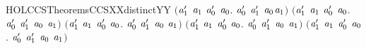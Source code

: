 \begin{SaveVerbatim}{HOLCCSTheoremsCCSXXdistinctYY}
   \ensuremath{(}\HOLSymConst{\HOLTokenForall{}}\ensuremath{\HOLBoundVar{a}\sb{\mathrm{1}}\sp{\prime{}}} \ensuremath{\HOLBoundVar{a}\sb{\mathrm{1}}} \ensuremath{\HOLBoundVar{a}\sb{\mathrm{0}}\sp{\prime{}}} \ensuremath{\HOLBoundVar{a}\sb{\mathrm{0}}}.  \ensuremath{\HOLBoundVar{a}\sb{\mathrm{0}}\sp{\prime{}}} \ensuremath{\HOLBoundVar{a}\sb{\mathrm{1}}\sp{\prime{}}} \HOLSymConst{\HOLTokenNotEqual{}} \ensuremath{\HOLBoundVar{a}\sb{\mathrm{0}}}\HOLSymConst{\ensuremath{\ldotp}}\ensuremath{\HOLBoundVar{a}\sb{\mathrm{1}}}\ensuremath{)} \HOLSymConst{\HOLTokenConj{}}
   \ensuremath{(}\HOLSymConst{\HOLTokenForall{}}\ensuremath{\HOLBoundVar{a}\sb{\mathrm{1}}\sp{\prime{}}} \ensuremath{\HOLBoundVar{a}\sb{\mathrm{1}}} \ensuremath{\HOLBoundVar{a}\sb{\mathrm{0}}\sp{\prime{}}} \ensuremath{\HOLBoundVar{a}\sb{\mathrm{0}}}. \ensuremath{\HOLBoundVar{a}\sb{\mathrm{0}}\sp{\prime{}}} \HOLSymConst{\ensuremath{\mid}} \ensuremath{\HOLBoundVar{a}\sb{\mathrm{1}}\sp{\prime{}}} \HOLSymConst{\HOLTokenNotEqual{}} \ensuremath{\HOLBoundVar{a}\sb{\mathrm{0}}} \HOLSymConst{\ensuremath{+}} \ensuremath{\HOLBoundVar{a}\sb{\mathrm{1}}}\ensuremath{)} \HOLSymConst{\HOLTokenConj{}}
   \ensuremath{(}\HOLSymConst{\HOLTokenForall{}}\ensuremath{\HOLBoundVar{a}\sb{\mathrm{1}}\sp{\prime{}}} \ensuremath{\HOLBoundVar{a}\sb{\mathrm{1}}} \ensuremath{\HOLBoundVar{a}\sb{\mathrm{0}}\sp{\prime{}}} \ensuremath{\HOLBoundVar{a}\sb{\mathrm{0}}}.  \ensuremath{\HOLBoundVar{a}\sb{\mathrm{0}}\sp{\prime{}}} \ensuremath{\HOLBoundVar{a}\sb{\mathrm{1}}\sp{\prime{}}} \HOLSymConst{\HOLTokenNotEqual{}} \ensuremath{\HOLBoundVar{a}\sb{\mathrm{0}}} \HOLSymConst{\ensuremath{+}} \ensuremath{\HOLBoundVar{a}\sb{\mathrm{1}}}\ensuremath{)} \HOLSymConst{\HOLTokenConj{}}
   \ensuremath{(}\HOLSymConst{\HOLTokenForall{}}\ensuremath{\HOLBoundVar{a}\sb{\mathrm{1}}\sp{\prime{}}} \ensuremath{\HOLBoundVar{a}\sb{\mathrm{1}}} \ensuremath{\HOLBoundVar{a}\sb{\mathrm{0}}\sp{\prime{}}} \ensuremath{\HOLBoundVar{a}\sb{\mathrm{0}}}.  \ensuremath{\HOLBoundVar{a}\sb{\mathrm{0}}\sp{\prime{}}} \ensuremath{\HOLBoundVar{a}\sb{\mathrm{1}}\sp{\prime{}}} \HOLSymConst{\HOLTokenNotEqual{}} \ensuremath{\HOLBoundVar{a}\sb{\mathrm{0}}} \HOLSymConst{\ensuremath{+}} \ensuremath{\HOLBoundVar{a}\sb{\mathrm{1}}}\ensuremath{)} \HOLSymConst{\HOLTokenConj{}}
   \ensuremath{(}\HOLSymConst{\HOLTokenForall{}}\ensuremath{\HOLBoundVar{a}\sb{\mathrm{1}}\sp{\prime{}}} \ensuremath{\HOLBoundVar{a}\sb{\mathrm{1}}} \ensuremath{\HOLBoundVar{a}\sb{\mathrm{0}}\sp{\prime{}}} \ensuremath{\HOLBoundVar{a}\sb{\mathrm{0}}}.  \ensuremath{\HOLBoundVar{a}\sb{\mathrm{0}}\sp{\prime{}}} \ensuremath{\HOLBoundVar{a}\sb{\mathrm{1}}\sp{\prime{}}} \HOLSymConst{\HOLTokenNotEqual{}} \ensuremath{\HOLBoundVar{a}\sb{\mathrm{0}}} \HOLSymConst{\ensuremath{+}} \ensuremath{\HOLBoundVar{a}\sb{\mathrm{1}}}\ensuremath{)} \HOLSymConst{\HOLTokenConj{}}

\end{SaveVerbatim}
